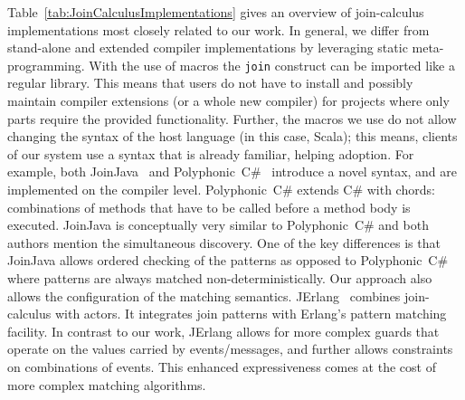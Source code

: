 \documentclass[runningheads]{llncs}
\begin{document}
\begin{sloppypar}
\begin{table}[h]
\centering
{}
\caption{}
\label{tab:JoinCalculusImplementations}
\end{table}

Table~\ref{tab:JoinCalculusImplementations} gives an overview of join-calculus
implementations most closely related to our work.
In general, we differ from stand-alone and extended compiler implementations
by leveraging static meta-programming. With the use of macros the \verb|join| construct
can be imported like a regular library. This means that users do not have to
install and possibly maintain compiler extensions (or a whole new compiler)
for projects where only parts require the provided functionality. Further, the
macros we use do not allow changing the syntax of the host language (in this case, Scala);
this means, clients of our system use a syntax that is already familiar, helping adoption.
For example, both
JoinJava~\cite{Itzstein:2001} and Polyphonic~C\#~\cite{Benton:2004} introduce
a novel syntax, and are implemented on the compiler level. Polyphonic~C\#
extends C\# with chords: combinations of methods that have to be called before
a method body is executed. JoinJava is conceptually very similar to
Polyphonic~C\# and both authors mention the simultaneous discovery. One of the key
differences is that JoinJava allows ordered checking of the patterns as
opposed to Polyphonic~C\# where patterns are always matched non-deterministically.
Our approach also allows the configuration of the matching
semantics. JErlang~\cite{Plociniczak:2010} combines join-calculus with actors.
It integrates join patterns with Erlang's pattern matching facility. In contrast to our
work, JErlang allows for more complex guards that operate on the values
carried by events/messages, and further allows constraints on combinations of
events. This enhanced expressiveness comes at the cost of more complex matching
algorithms.


\end{sloppypar}
\end{document}
